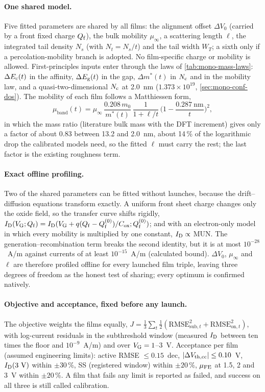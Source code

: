 \paragraph{One shared model.} Five fitted parameters are shared by all films: the alignment offset $\Delta V_0$ (carried
by a front fixed charge $Q_{\mathrm{f}}$), the bulk mobility $\mu_\infty$, a scattering length $\ell$, the integrated tail density
$N_s$ (with $N_t = N_s/t$) and the tail width $W_T$; a sixth only if a percolation-mobility branch is adopted. No
film-specific charge or mobility is allowed. First-principles inputs enter through the laws of
\cref{tab:mono-mass-laws}: $\Delta E_{\mathrm{c}}(t)$ in the affinity, $\Delta E_{\mathrm{g}}(t)$ in the gap, $\Delta m^*(t)$ in $N_{\mathrm{c}}$ and in the
mobility law, and a quasi-two-dimensional $N_{\mathrm{c}}$ at 2.0~nm ($1.373\times10^{19}$\cmcu{}, \cref{sec:mono-conf-dos}). The
mobility of each film follows a Matthiessen form,
\begin{equation}
\mu_{\mathrm{band}}(t) = \mu_\infty\,\frac{0.208\,m_0}{m^*(t)}\,\frac{1}{1+\ell/t}\,\Big(1-\frac{0.287~\mathrm{nm}}{t}\Big)^2 ,
\label{eq:mono-c10-mu}
\end{equation}
in which the mass ratio (literature bulk mass with the DFT increment) gives only a factor of about 0.83 between 13.2
and 2.0~nm, about 14\,\% of the logarithmic drop the calibrated models need, so the fitted $\ell$ must carry the rest; the last factor is the existing roughness term.

\paragraph{Exact offline profiling.} Two of the shared parameters can be fitted without launches, because the
drift--diffusion equations transform exactly. A uniform front sheet charge changes only the oxide field, so the transfer
curve shifts rigidly, $I_{\mathrm{D}}(V_{\mathrm{G}};Q_{\mathrm{f}}) = I_{\mathrm{D}}(V_{\mathrm{G}} + q(Q_{\mathrm{f}}-Q_{\mathrm{f}}^{(0)})/C_{\mathrm{ox}};Q_{\mathrm{f}}^{(0)})$; and with an electron-only model in
which every mobility is multiplied by one constant, $I_{\mathrm{D}} \propto$ MUN. The generation--recombination term breaks the
second identity, but it is at most $10^{-28}$~A/\textmu m against currents of at least $10^{-15}$~A/\textmu m
(calculated bound). $\Delta V_0$, $\mu_\infty$ and $\ell$ are therefore profiled offline for every launched film triple,
leaving three degrees of freedom as the honest test of sharing; every optimum is confirmed natively.

\paragraph{Objective and acceptance, fixed before any launch.} The objective weights the films equally,
$J = \tfrac13\sum_t\tfrac12(\mathrm{RMSE}^2_{\mathrm{sub},t} + \mathrm{RMSE}^2_{\mathrm{on},t})$, with log-current residuals
in the subthreshold window (measured $I_{\mathrm{D}}$ between ten times the floor and $10^{-9}$~A/\textmu m) and over
$V_{\mathrm{G}} = 1$--3~V. Acceptance per film (assumed engineering limits): active RMSE $\le0.15$~dec, $|\Delta V_{\mathrm{th,cc}}|\le0.10$~V,
$I_{\mathrm{D}}(3~\mathrm{V})$ within $\pm30$\,\%, SS (registered window) within $\pm20$\,\%, $\mu_{\mathrm{FE}}$ at 1.5, 2 and 3~V within
$\pm20$\,\%. A film that fails any limit is reported as failed, and success on all three is still called calibration.

